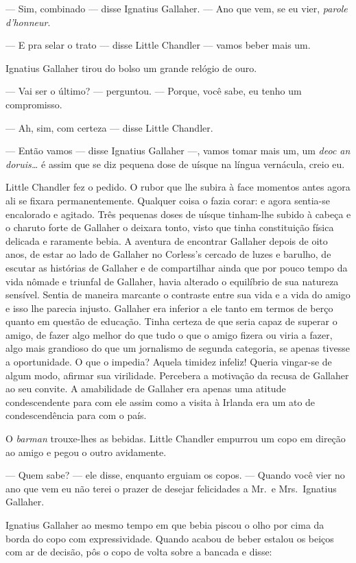 --- Sim, combinado --- disse Ignatius Gallaher.  --- Ano que vem, se eu vier,
\textit{parole d’honneur}.

--- E pra selar o trato --- disse Little Chandler --- vamos beber mais um.

Ignatius Gallaher tirou do bolso um grande relógio de ouro.

--- Vai ser o último? --- perguntou.  --- Porque, você sabe, eu tenho um
compromisso.

--- Ah, sim, com certeza --- disse Little Chandler.

--- Então vamos --- disse Ignatius Gallaher ---, vamos tomar mais um, um
\textit{deoc an doruis\ldots{}} é assim que se diz pequena dose de uísque na
língua vernácula, creio eu.

Little Chandler fez o pedido.  O rubor que lhe subira à face momentos antes
agora ali se fixara permanentemente.  Qualquer coisa o fazia corar: e agora
sentia-se encalorado e agitado.  Três pequenas doses de uísque tinham-lhe
subido à cabeça e o charuto forte de Gallaher o deixara tonto, visto que tinha
constituição física delicada e raramente bebia.  A aventura de encontrar
Gallaher depois de oito anos, de estar ao lado de Gallaher no Corless’s cercado
de luzes e barulho, de escutar as histórias de Gallaher e de compartilhar ainda
que por pouco tempo da vida nômade e triunfal de Gallaher, havia alterado o
equilíbrio de sua natureza sensível.  Sentia de maneira marcante o contraste
entre sua vida e a vida do amigo e isso lhe parecia injusto.  Gallaher era
inferior a ele tanto em termos de berço quanto em questão de educação.  Tinha
certeza de que seria capaz de superar o amigo, de fazer algo melhor do que tudo
o que o amigo fizera ou viria a fazer, algo mais grandioso do que um jornalismo
de segunda categoria, se apenas tivesse a oportunidade.  O que o impedia?
Aquela timidez infeliz!  Queria vingar-se de algum modo, afirmar sua
virilidade.  Percebera a motivação da recusa de Gallaher ao seu convite.  A
amabilidade de Gallaher era apenas uma atitude condescendente para com ele
assim como a visita à Irlanda era um ato de condescendência para com o país.

O \textit{barman} trouxe-lhes as bebidas.  Little Chandler empurrou um copo em
direção ao amigo e pegou o outro avidamente.

--- Quem sabe? --- ele disse, enquanto erguiam os copos.  --- Quando você vier
no ano que vem eu não terei o prazer de desejar felicidades a Mr.~e Mrs.~Ignatius Gallaher.

Ignatius Gallaher ao mesmo tempo em que bebia piscou o olho por cima da borda
do copo com expressividade.  Quando acabou de beber estalou os beiços com ar de
decisão, pôs o copo de volta sobre a bancada e disse:

